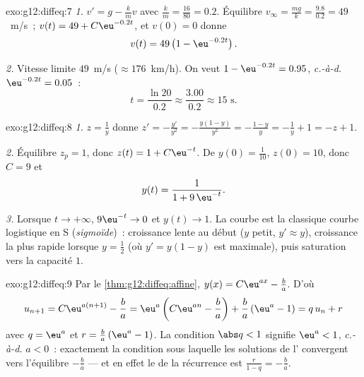 \begin{solution}{exo:g12:diffeq:7}
\emph{1.} $v' = g - \frac{k}{m} v$ avec $\frac km = \frac{16}{80} = 0.2$.
Équilibre $v_\infty = \frac{mg}{k} = \frac{9.8}{0.2} = 49$~m/s~;
$v(t) = 49 + C\eu^{-0.2t}$, et $v(0) = 0$ donne
\[
v(t) = 49\left(1 - \eu^{-0.2 t}\right).
\]

\emph{2.} Vitesse limite $49$~m/s ($\approx 176$~km/h). On veut
$1 - \eu^{-0.2t} = 0.95$, \emph{c.-à-d.} $\eu^{-0.2t} = 0.05$~:
\[
t = \frac{\ln 20}{0.2} \approx \frac{3.00}{0.2} \approx 15 \text{ s}.
\]
\end{solution}

\begin{solution}{exo:g12:diffeq:8}
\emph{1.} $z = \frac1y$ donne $z' = -\frac{y'}{y^2}
= -\frac{y(1-y)}{y^2} = -\frac{1-y}{y} = -\frac1y + 1 = -z + 1$.

\emph{2.} Équilibre $z_p = 1$, donc $z(t) = 1 + C\eu^{-t}$. De
$y(0) = \frac{1}{10}$, $z(0) = 10$, donc $C = 9$ et
\[
y(t) = \frac{1}{1 + 9\,\eu^{-t}} .
\]

\emph{3.} Lorsque $t \to +\infty$, $9\eu^{-t} \to 0$ et $y(t) \to 1$. La
courbe est la classique courbe logistique en S (\emph{sigmoïde})~:
croissance lente au début ($y$ petit, $y' \approx y$), croissance la plus
rapide lorsque $y = \frac12$ (où $y' = y(1-y)$ est maximale), puis
saturation vers la capacité $1$.
\end{solution}

\begin{solution}{exo:g12:diffeq:9}
Par le \cref{thm:g12:diffeq:affine}, $y(x) = C\eu^{ax} - \frac ba$. D'où
\[
u_{n+1} = C\eu^{a(n+1)} - \frac ba
= \eu^{a}\left(C\eu^{an} - \frac ba\right) + \frac ba\left(\eu^a - 1\right)
= q\,u_n + r
\]
avec $q = \eu^{a}$ et $r = \frac{b}{a}\left(\eu^{a} - 1\right)$.
La condition $\abs q < 1$ signifie $\eu^a < 1$, \emph{c.-à-d.} $a < 0$~:
exactement la condition sous laquelle les solutions de l' convergent vers l'équilibre $-\frac ba$ --- et en effet le
 de la récurrence est $\frac{r}{1 - q} = -\frac{b}{a}$.
\end{solution}

